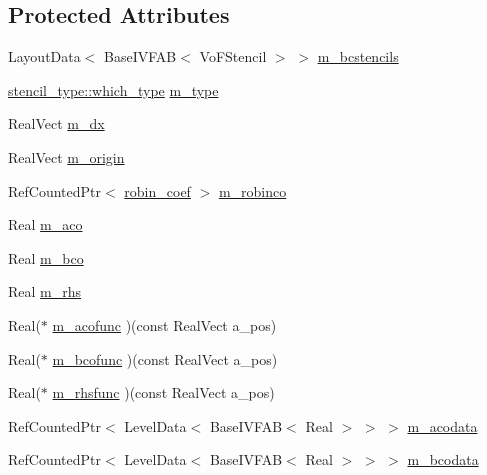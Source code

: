 \subsection*{Protected Attributes}
\begin{DoxyCompactItemize}
\item 
Layout\+Data$<$ Base\+I\+V\+F\+AB$<$ Vo\+F\+Stencil $>$ $>$ \hyperlink{classrobinconductivityebbc_ab9f762584c2f02f35c3130e90eb1c447}{m\+\_\+bcstencils}
\item 
\hyperlink{namespacestencil__type_a1ffed19935b7289b50e8dcc017ee99c8}{stencil\+\_\+type\+::which\+\_\+type} \hyperlink{classrobinconductivityebbc_a51c381343f6742475b9255fb1a0aed1d}{m\+\_\+type}
\item 
Real\+Vect \hyperlink{classrobinconductivityebbc_a7bf3608cb451079736a42975b083dcaa}{m\+\_\+dx}
\item 
Real\+Vect \hyperlink{classrobinconductivityebbc_ad9f0984909661443c1d7c4d207fa8ee8}{m\+\_\+origin}
\item 
Ref\+Counted\+Ptr$<$ \hyperlink{classrobin__coef}{robin\+\_\+coef} $>$ \hyperlink{classrobinconductivityebbc_ae5c6e3aa684995004943ce801abb13a5}{m\+\_\+robinco}
\item 
Real \hyperlink{classrobinconductivityebbc_a463f9277e8eae417183e890852a11008}{m\+\_\+aco}
\item 
Real \hyperlink{classrobinconductivityebbc_a18d83321dafb63690393cb1a20f8441d}{m\+\_\+bco}
\item 
Real \hyperlink{classrobinconductivityebbc_aff33d888b22994b8edf250b109136653}{m\+\_\+rhs}
\item 
Real($\ast$ \hyperlink{classrobinconductivityebbc_ad7a0ac42c881a9306275a74e0fc60c60}{m\+\_\+acofunc} )(const Real\+Vect a\+\_\+pos)
\item 
Real($\ast$ \hyperlink{classrobinconductivityebbc_a565052f51d8a07a73d09bac5dd63b2d6}{m\+\_\+bcofunc} )(const Real\+Vect a\+\_\+pos)
\item 
Real($\ast$ \hyperlink{classrobinconductivityebbc_af250e96cbbf26f1500d61e242f445f95}{m\+\_\+rhsfunc} )(const Real\+Vect a\+\_\+pos)
\item 
Ref\+Counted\+Ptr$<$ Level\+Data$<$ Base\+I\+V\+F\+AB$<$ Real $>$ $>$ $>$ \hyperlink{classrobinconductivityebbc_a6490a5545dfe2cf3c0c03f858d8ad7f5}{m\+\_\+acodata}
\item 
Ref\+Counted\+Ptr$<$ Level\+Data$<$ Base\+I\+V\+F\+AB$<$ Real $>$ $>$ $>$ \hyperlink{classrobinconductivityebbc_aec962607d910fd59f69708624f3bf23c}{m\+\_\+bcodata}
\item 

\end{DoxyCompactItemize}
